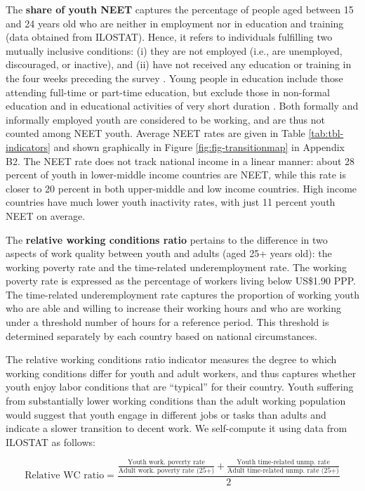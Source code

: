 \documentclass[
  a4paper, twoside, 12pt]{book}
\begin{document}
The \textbf{share of youth NEET} captures the percentage of people aged between 15 and 24 years old who are neither in employment nor in education and training (data obtained from ILOSTAT). Hence, it refers to individuals fulfilling two mutually inclusive conditions: (i) they are not employed (i.e., are unemployed, discouraged, or inactive), and (ii) have not received any education or training in the four weeks preceding the survey \autocite{elder2015a}. Young people in education include those attending full-time or part-time education, but exclude those in non-formal education and in educational activities of very short duration \autocite{oecd2019}. Both formally and informally employed youth are considered to be working, and are thus not counted among NEET youth. Average NEET rates are given in Table \ref{tab:tbl-indicators} and shown graphically in Figure \ref{fig:fig-transitionmap} in Appendix B2. The NEET rate does not track national income in a linear manner: about 28 percent of youth in lower-middle income countries are NEET, while this rate is closer to 20 percent in both upper-middle and low income countries. High income countries have much lower youth inactivity rates, with just 11 percent youth NEET on average.

The \textbf{relative working conditions ratio} pertains to the difference in two aspects of work quality between youth and adults (aged 25+ years old): the working poverty rate and the time-related underemployment rate. The working poverty rate is expressed as the percentage of workers living below US\$1.90 PPP. The time-related underemployment rate captures the proportion of working youth who are able and willing to increase their working hours and who are working under a threshold number of hours for a reference period. This threshold is determined separately by each country based on national circumstances.

The relative working conditions ratio indicator measures the degree to which working conditions differ for youth and adult workers, and thus captures whether youth enjoy labor conditions that are ``typical'' for their country. Youth suffering from substantially lower working conditions than the adult working population would suggest that youth engage in different jobs or tasks than adults and indicate a slower transition to decent work. We self-compute it using data from ILOSTAT as follows:

\footnotesize

\[ \text{Relative WC ratio}= \frac{\displaystyle{\frac{\text{Youth work. poverty rate}}{\text{Adult work. poverty rate (25+)}}} + \displaystyle{\frac{\text{Youth time-related unmp. rate}}{\text{Adult time-related unmp. rate (25+)}}}}{2} \]
\normalsize
\vspace*{5pt}
\end{document}

